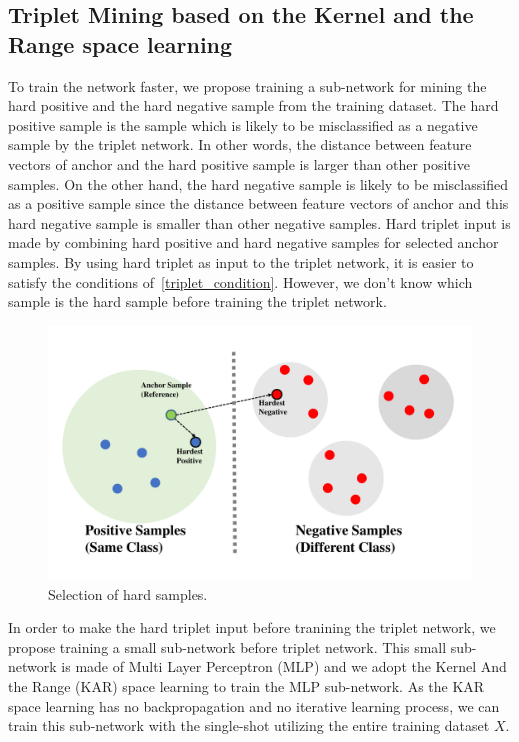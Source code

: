 \subsection{Triplet Mining based on the Kernel and the Range space learning}
To train the network faster, we propose training a sub-network for mining the hard positive and the hard negative sample from the training dataset.
The hard positive sample is the sample which is likely to be misclassified as a negative sample by the triplet network.
In other words, the distance between feature vectors of anchor and the hard positive sample is larger than other positive samples.
On the other hand, the hard negative sample is likely to be misclassified as a positive sample since the distance between feature vectors of anchor and this hard negative sample is smaller than other negative samples.
Hard triplet input is made by combining hard positive and hard negative samples for selected anchor samples. By using hard triplet as input to the triplet network, it is easier to satisfy the conditions of~\ref{triplet_condition}. However, we don't know which sample is the hard sample before training the triplet network.
\begin{figure}[!ht]
    \includegraphics[width=\textwidth]
        {fig_hardsample_v1.pdf}
    \caption{Selection of hard samples.} \label{fig2}
\end{figure}
In order to make the hard triplet input before tranining the triplet network, we propose training a small sub-network before triplet network.
This small sub-network is made of Multi Layer Perceptron (MLP) and we adopt the Kernel And the Range (KAR) space learning to train the MLP sub-network. As the KAR space learning has no backpropagation and no iterative learning process, we can train this sub-network with the single-shot utilizing the entire training dataset $X$. 
